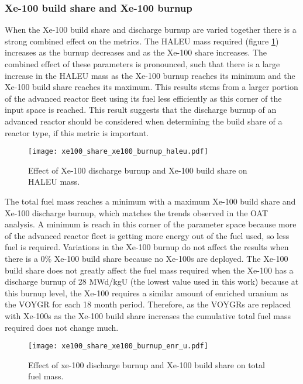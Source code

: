 \subsubsection{Xe-100 build share and Xe-100 burnup}
When the Xe-100 build share and discharge burnup are varied together
there is a strong combined effect on the metrics. The \gls{HALEU} 
mass required (figure \ref{fig:xe100_share_xe100_burnup_haleu}) 
increases as the burnup decreases and as the Xe-100 share increases.
The combined effect of these parameters is pronounced, such that there 
is a large increase in the \gls{HALEU} mass as the Xe-100 burnup 
reaches its minimum and the Xe-100 build share reaches its maximum. This 
results stems from a larger portion of the advanced reactor fleet 
using its fuel less efficiently as this corner of the input space is 
reached. This result suggests that the discharge burnup of an advanced 
reactor should be considered when determining the build share of a reactor
type, if this metric is important. 

\begin{figure}[h!]
    \centering
    \texttt{[image: xe100\_share\_xe100\_burnup\_haleu.pdf]}
    \caption{Effect of Xe-100 discharge burnup and Xe-100 build share 
    on HALEU mass.}
    \label{fig:xe100_share_xe100_burnup_haleu}
\end{figure}

The total fuel mass reaches a minimum with a maximum Xe-100 build share 
and Xe-100 discharge burnup, which matches the trends observed in the 
\gls{OAT} analysis. A minimum is reach in this corner of the parameter 
space because more of the advanced reactor fleet is getting more 
energy out of the fuel used, so less fuel is required. Variations in the 
Xe-100 burnup do not affect the results when there is a 0\% Xe-100 build 
share because no Xe-100s are deployed. The Xe-100 build share does not 
greatly affect the fuel mass required when the Xe-100 has a discharge 
burnup of 28 MWd/kgU (the lowest value used in this work) because at this 
burnup level, the Xe-100 requires a similar amount of enriched uranium as 
the VOYGR for each 18 month period. Therefore, as the VOYGRs are replaced 
with Xe-100s as the Xe-100 build share increases the cumulative total 
fuel mass required does not change much. 

\begin{figure}[h!]
    \centering
    \texttt{[image: xe100\_share\_xe100\_burnup\_enr\_u.pdf]}
    \caption{Effect of xe-100 discharge burnup and Xe-100 build share 
    on total fuel mass.}
    \label{fig:xe100_share_xe100_burnup_enr_u}
\end{figure}

